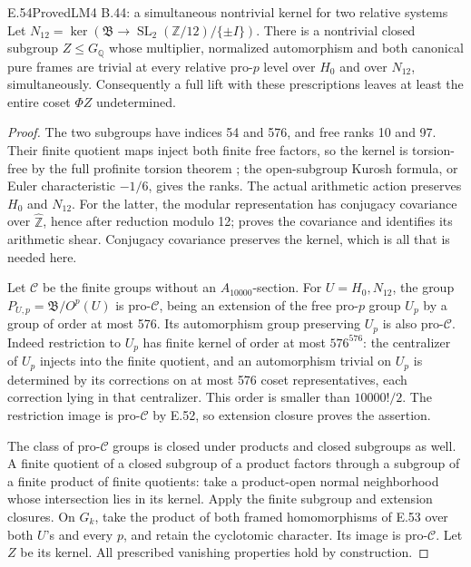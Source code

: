 \begin{result}{E.54}{Proved}{LM4 B.44: a simultaneous nontrivial kernel for two relative systems}
Let \(N_{12}=\ker(\mathfrak B\to
\operatorname{SL}_2(\mathbb Z/12)/\{\pm I\})\).
There is a nontrivial closed subgroup \(Z\le G_{\mathbb Q}\) whose
multiplier, normalized automorphism and both canonical pure frames
are trivial at every relative pro-\(p\) level over \(H_0\) and over
\(N_{12}\), simultaneously. Consequently a full lift with these
prescriptions leaves at least the entire coset \(\Phi Z\)
undetermined.
\end{result}
\begin{proof}
The two subgroups have indices 54 and 576, and free ranks 10 and 97.
Their finite quotient maps inject both finite free factors, so the
kernel is torsion-free by the full profinite torsion theorem
\citep[Theorem A']{SymHerfortRibes1985}; the open-subgroup Kurosh
formula, or Euler characteristic \(-1/6\), gives the ranks.
The actual arithmetic action preserves \(H_0\) and \(N_{12}\).
For the latter, the modular representation has conjugacy covariance
over \(\widehat{\mathbb Z}\), hence after reduction modulo 12;
\citet[\S4, pp.~774--776]{SymMarin2008} proves the covariance and
identifies its arithmetic shear. Conjugacy covariance preserves the
kernel, which is all that is needed here.

Let \(\mathscr C\) be the finite groups without an
\(A_{10000}\)-section. For \(U=H_0,N_{12}\), the group
\(P_{U,p}=\mathfrak B/O^p(U)\) is pro-\(\mathscr C\), being
an extension of the free pro-\(p\) group \(U_p\) by a group of
order at most 576. Its automorphism group preserving \(U_p\) is
also pro-\(\mathscr C\). Indeed restriction to \(U_p\) has finite
kernel of order at most \(576^{576}\): the centralizer of \(U_p\)
injects into the finite quotient, and an automorphism trivial on
\(U_p\) is determined by its corrections on at most 576 coset
representatives, each correction lying in that centralizer.
This order is smaller than \(10000!/2\). The restriction image is
pro-\(\mathscr C\) by E.52, so extension closure proves the assertion.

The class of pro-\(\mathscr C\) groups is closed under products
and closed subgroups as well. A finite quotient of a closed subgroup
of a product factors through a subgroup of a finite product of finite
quotients: take a product-open normal neighborhood whose intersection
lies in its kernel. Apply the finite subgroup and extension closures.
On \(G_k\), take the product of both framed homomorphisms of E.53
over both \(U\)'s and every \(p\), and retain the cyclotomic
character. Its image is pro-\(\mathscr C\). Let \(Z\) be its kernel.
All prescribed vanishing properties hold by construction.


\end{proof}
